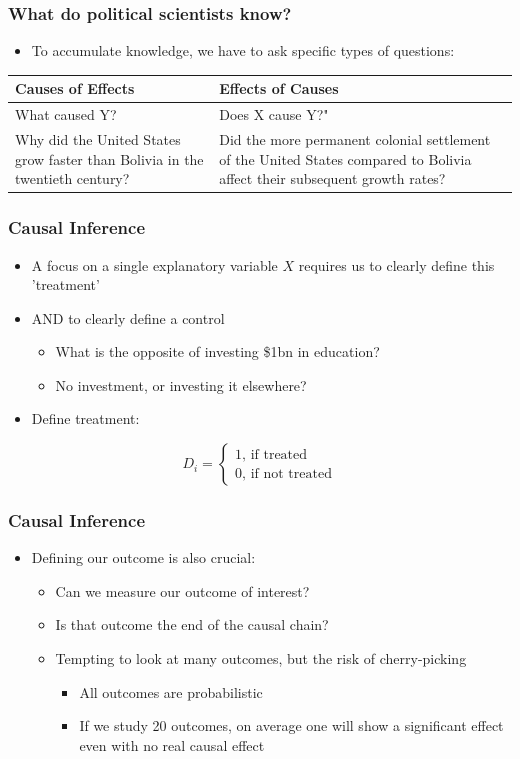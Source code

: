 \documentclass[xcolor=x11names,compress]{beamer}\usepackage[]{graphicx}\usepackage[]{color}
\renewcommand{\(}{\begin{columns}}
\renewcommand{\)}{\end{columns}}
\newcommand{\<}[1]{\begin{column}{#1}}
\renewcommand{\>}{\end{column}}
\begin{document}
\begin{frame}
\frametitle{What do political scientists \textbf{know}?}
\begin{itemize}
\item To accumulate knowledge, we have to ask specific types of questions:
\end{itemize}
\begin{table}[htbp]
  \centering
    \begin{tabular}{|>{\raggedright}p{5cm}|p{5cm}|}
    \toprule
    \textbf{Causes of Effects} & \textbf{Effects of Causes} \\
    \midrule
    What caused Y? & Does X cause Y?" \\
    \midrule
    Why did the United States grow faster than Bolivia in the twentieth century? & Did the more permanent colonial settlement of the United States compared to Bolivia affect their subsequent growth rates? \\
    \bottomrule
    \end{tabular}%
  \label{tab:addlabel}%
\end{table}%
\end{frame}

\begin{frame}
\frametitle{Causal Inference}
\begin{itemize}
\item A focus on a single explanatory variable $X$ requires us to clearly define this 'treatment' 
\item AND to clearly define a control
\begin{itemize}
\item What is the opposite of investing \$1bn in education?
\item No investment, or investing it elsewhere?
\end{itemize}
\item Define treatment:
\end{itemize}
\[D_i = 
\begin{cases}
1 \text{, if treated} \\
0 \text{, if not treated}
\end{cases}
\]
\end{frame}

\begin{frame}
\frametitle{Causal Inference}
\begin{itemize}
\item Defining our outcome is also crucial:
\begin{itemize}
\item Can we measure our outcome of interest?
\item Is that outcome the end of the causal chain?
\item Tempting to look at many outcomes, but the risk of cherry-picking
\begin{itemize}
\item All outcomes are probabilistic
\item If we study 20 outcomes, on average one will show a significant effect even with no real causal effect
\end{itemize}
\end{itemize}
\end{itemize}
\end{frame}
\end{document}
